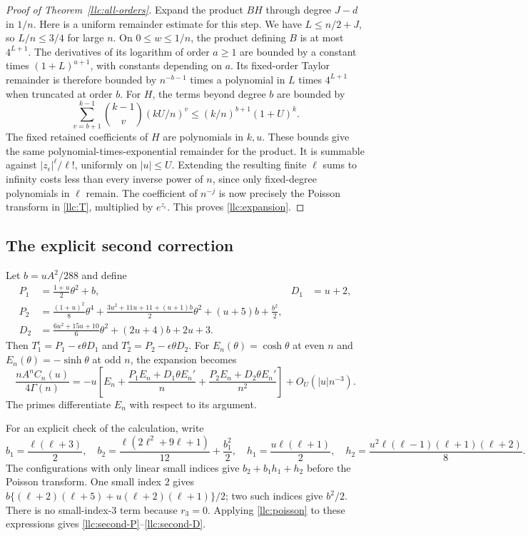 \begin{proof}[Proof of Theorem~\ref{llc:all-orders}]
Expand the product $BH$ through degree $J-d$ in $1/n$.
Here is a uniform remainder estimate for this step. We have
$L\le n/2+J$, so $L/n\le3/4$ for large $n$.
On $0\le w\le1/n$, the product defining $B$ is at most $4^{L+1}$.
The derivatives of its logarithm of order $a\ge1$ are bounded by
a constant times $(1+L)^{a+1}$, with constants depending on $a$.
Its fixed-order Taylor remainder is therefore bounded by
$n^{-b-1}$ times a polynomial in $L$ times $4^{L+1}$ when truncated
at order $b$. For $H$, the terms beyond degree $b$ are bounded by
\[
 \sum_{v=b+1}^{k-1}\binom{k-1}{v}(kU/n)^v
 \le (k/n)^{b+1}(1+U)^k.
\]
The fixed retained coefficients of $H$ are polynomials in $k,u$.
These bounds give the same polynomial-times-exponential remainder
for the product. It is summable against $|z_\epsilon|^\ell/\ell!$,
uniformly on $|u|\le U$. Extending the resulting finite $\ell$ sums
to infinity costs less than every inverse power of $n$, since only
fixed-degree polynomials in $\ell$ remain. The coefficient of $n^{-j}$
is now precisely the Poisson transform in \eqref{llc:T}, multiplied
by $e^{z_\epsilon}$. This proves \eqref{llc:expansion}.
\end{proof}

\subsection{The explicit second correction}

Let $b=uA^2/288$ and define
\begin{align}
 P_1&=\frac{1+u}{2}\theta^2+b,& D_1&=u+2,\label{llc:first}\\
 P_2&=\frac{(1+u)^2}{8}\theta^4
 +\frac{3u^2+11u+11+(u+1)b}{2}\theta^2
 +(u+5)b+\frac{b^2}{2},\label{llc:second-P}\\
 D_2&=\frac{6u^2+15u+10}{6}\theta^2+(2u+4)b+2u+3.
 \label{llc:second-D}
\end{align}
Then $T_1^\epsilon=P_1-\epsilon\theta D_1$ and
$T_2^\epsilon=P_2-\epsilon\theta D_2$.
For $E_n(\theta)=\cosh\theta$ at even $n$ and
$E_n(\theta)=-\sinh\theta$ at odd $n$, the expansion becomes
\begin{equation}\label{llc:second}
 \frac{nA^nC_n(u)}{4\Gamma(n)}
 =-u\left[E_n+\frac{P_1E_n+D_1\theta E_n'}n
              +\frac{P_2E_n+D_2\theta E_n'}{n^2}\right]
       +O_U(|u|n^{-3}).
\end{equation}
The primes differentiate $E_n$ with respect to its argument.

For an explicit check of the calculation, write
\[
 b_1=\frac{\ell(\ell+3)}2,\quad
 b_2=\frac{\ell(2\ell^2+9\ell+1)}{12}+\frac{b_1^2}{2},\quad
 h_1=\frac{u\ell(\ell+1)}2,\quad
 h_2=\frac{u^2\ell(\ell-1)(\ell+1)(\ell+2)}8.
\]
The configurations with only linear small indices give
$b_2+b_1h_1+h_2$ before the Poisson transform.
One small index $2$ gives
$b\{(\ell+2)(\ell+5)+u(\ell+2)(\ell+1)\}/2$;
two such indices give $b^2/2$. There is no small-index-$3$
term because $r_3=0$. Applying \eqref{llc:poisson} to these
expressions gives \eqref{llc:second-P}--\eqref{llc:second-D}.

